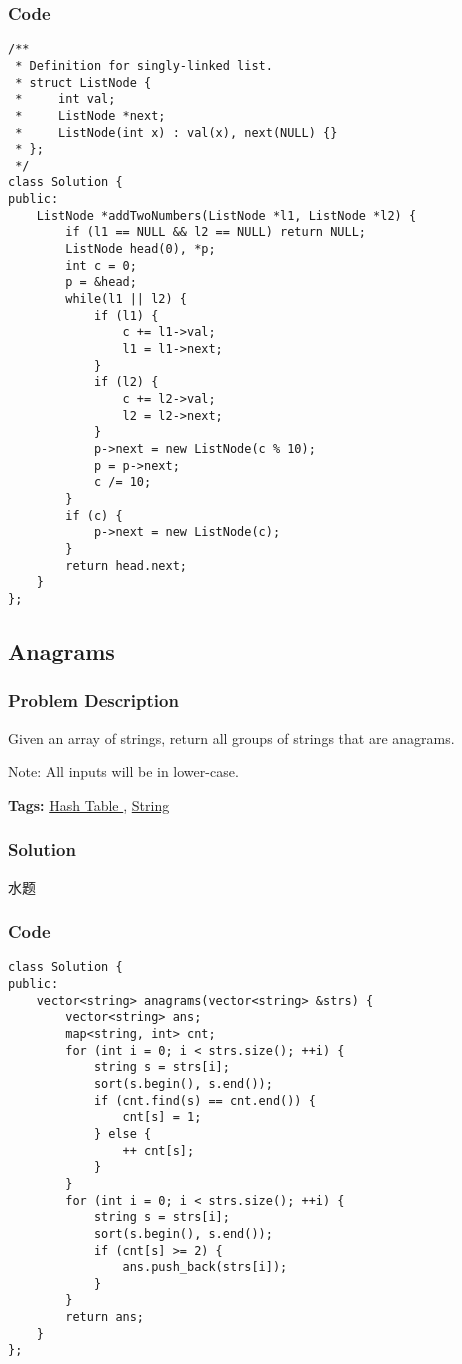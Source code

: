\documentclass{article}
\begin{document}
\begin{CJK*}{UTF8}{gkai}
\subsubsection*{Code}
\begin{lstlisting}
/**
 * Definition for singly-linked list.
 * struct ListNode {
 *     int val;
 *     ListNode *next;
 *     ListNode(int x) : val(x), next(NULL) {}
 * };
 */
class Solution {
public:
    ListNode *addTwoNumbers(ListNode *l1, ListNode *l2) {
        if (l1 == NULL && l2 == NULL) return NULL;
        ListNode head(0), *p;
        int c = 0;
        p = &head;
        while(l1 || l2) {
            if (l1) {
                c += l1->val;
                l1 = l1->next;
            }
            if (l2) {
                c += l2->val;
                l2 = l2->next;
            }
            p->next = new ListNode(c % 10);
            p = p->next;
            c /= 10;
        }
        if (c) {
            p->next = new ListNode(c);
        }
        return head.next;
    }
}; 
\end{lstlisting}


\subsection{ Anagrams }
\label{ Anagrams }

\subsubsection*{Problem Description}
Given an array of strings, return all groups of strings that are anagrams.

Note: All inputs will be in lower-case.


\textbf{Tags: }
\hyperref[ Hash Table ]{ Hash Table },  \hyperref[ String ]{ String }



\subsubsection*{Solution}
水题

\subsubsection*{Code}
\begin{lstlisting}
class Solution {
public:
    vector<string> anagrams(vector<string> &strs) {
        vector<string> ans;
        map<string, int> cnt;
        for (int i = 0; i < strs.size(); ++i) {
            string s = strs[i];
            sort(s.begin(), s.end());
            if (cnt.find(s) == cnt.end()) {
                cnt[s] = 1;
            } else {
                ++ cnt[s];
            }
        }
        for (int i = 0; i < strs.size(); ++i) {
            string s = strs[i];
            sort(s.begin(), s.end());
            if (cnt[s] >= 2) {
                ans.push_back(strs[i]);
            }
        }
        return ans;
    }
};


\end{lstlisting}
\end{CJK*}
\end{document}
